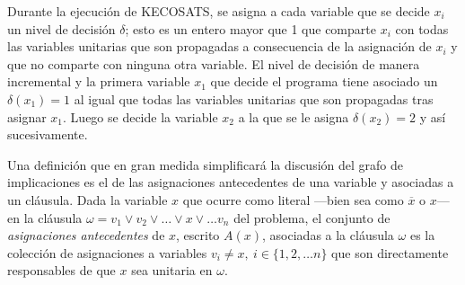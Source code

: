 \documentclass[12pt,lettersize,oneside]{article}
\begin{document}


Durante la ejecución de KECOSATS, se asigna a cada variable que se decide $x_i$
un nivel de decisión $\delta$; esto es un entero mayor que 1 que comparte $x_i$
con todas las variables unitarias que son propagadas a consecuencia de la
asignación de $x_i$ y que no comparte con ninguna otra variable. El nivel de
decisión de manera incremental y la primera variable $x_1$ que decide el
programa tiene asociado un $\delta(x_1) =1$ al igual que todas las variables
unitarias que son propagadas tras asignar $x_1$. Luego se decide la variable
$x_2$ a la que se le asigna $\delta(x_2)=2$ y así sucesivamente.

Una definición que en gran medida simplificará la discusión del grafo de
implicaciones es el de las asignaciones antecedentes de una variable y
asociadas a un cláusula. Dada la variable $x$ que ocurre como literal ---bien
sea como $\overline{x}$ o $x$--- en la cláusula $\omega = v_1 \vee v_2 \vee
\ldots \vee x \vee \ldots v_n$ del problema, el conjunto de \emph{asignaciones
  antecedentes} de $x$, escrito $A(x)$, asociadas a la cláusula $\omega$ es
la colección de asignaciones a variables $v_i \neq x,\ i \in \{1,2,\ldots n\}$
que son directamente responsables de que $x$ sea unitaria en $\omega$.
\end{document}
